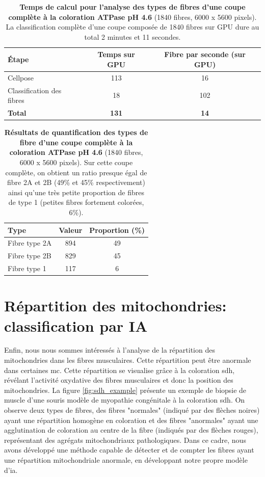 \begin{table}[!htbp]
\centering
\caption[Temps de calcul pour l'analyse des types de fibres d'une coupe complète ATPase]{\textbf{Temps de calcul pour l'analyse des types de fibres d'une coupe complète à la coloration ATPase pH 4.6} (1840 fibres, 6000 x 5600 pixels). La classification complète d'une coupe composée de 1840 fibres sur GPU dure au total 2 minutes et 11 secondes.}
\label{tab:atp_wsi_timetable}
\begin{tabular}{|l|c|c|}
\hline
\textbf{Étape} & \textbf{Temps sur GPU} & \textbf{Fibre par seconde (sur GPU)} \\
\hline
Cellpose & 113 & 16 \\
\hline
Classification des fibres & 18 & 102 \\
\hline
\textbf{Total} & \textbf{131} & \textbf{14} \\
\hline
\end{tabular}
\end{table}
\begin{table}[!htbp]
\centering
\caption[Résultats de quantification des types de fibre d'une coupe complète ATPase]{\textbf{Résultats de quantification des types de fibre d'une coupe complète à la coloration ATPase pH 4.6} (1840 fibres, 6000 x 5600 pixels). Sur cette coupe complète, on obtient un ratio presque égal de fibre 2A et 2B (49\% et 45\% respectivement) ainsi qu'une très petite proportion de fibres de type 1 (petites fibres fortement colorées, 6\%).}
\label{tab:atp_wsi_resultstable}
\begin{tabular}{|l|c|c|}
\hline
\textbf{Type} & \textbf{Valeur} & \textbf{Proportion (\%)} \\
\hline
Fibre type 2A & 894 & 49 \\
\hline
Fibre type 2B & 829 & 45 \\
\hline
Fibre type 1 & 117 & 6 \\
\hline
\end{tabular}
\end{table}

\clearpage
\section{Répartition des mitochondries: classification par IA}
Enfin, nous nous sommes intéressés à l'analyse de la répartition des mitochondries dans les fibres musculaires. Cette répartition peut être anormale dans certaines \gls{mc}. Cette répartition se visualise grâce à la coloration \gls{sdh}, révélant l'activité oxydative des fibres musculaires et donc la position des mitochondries. La figure \ref{fig:sdh_example} présente un exemple de biopsie de muscle d'une souris modèle de myopathie congénitale à la coloration \gls{sdh}. On observe deux types de fibres, des fibres "normales" (indiqué par des flèches noires) ayant une répartition homogène en coloration et des fibres "anormales" ayant une agglutination de coloration au centre de la fibre (indiqués par des flèches rouges), représentant des agrégats mitochondriaux pathologiques. Dans ce cadre, nous avons développé une méthode capable de détecter et de compter les fibres ayant une répartition mitochondriale anormale, en développant notre propre modèle d'\gls{ia}.

